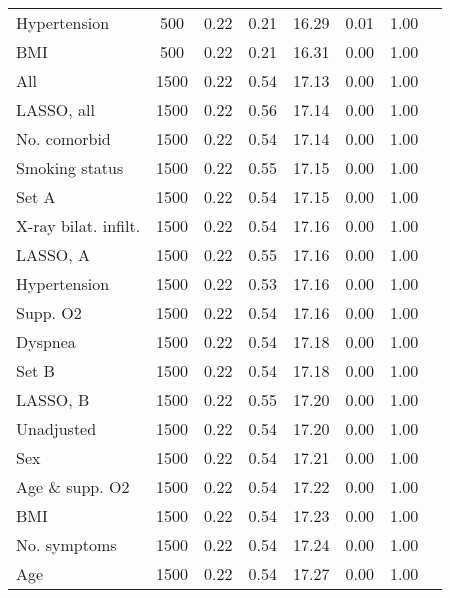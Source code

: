 \documentclass{article}
\begin{document}
{\begin{longtable}{lccccccc}
Hypertension & 500 & 0.22 & 0.21 & 16.29 & 0.01 & 1.00\\
BMI & 500 & 0.22 & 0.21 & 16.31 & 0.00 & 1.00\\ \midrule
All & 1500 & 0.22 & 0.54 & 17.13 & 0.00 & 1.00\\
LASSO, all & 1500 & 0.22 & 0.56 & 17.14 & 0.00 & 1.00\\
No. comorbid & 1500 & 0.22 & 0.54 & 17.14 & 0.00 & 1.00\\
Smoking status & 1500 & 0.22 & 0.55 & 17.15 & 0.00 & 1.00\\
Set A & 1500 & 0.22 & 0.54 & 17.15 & 0.00 & 1.00\\
X-ray bilat. infilt. & 1500 & 0.22 & 0.54 & 17.16 & 0.00 & 1.00\\
LASSO, A & 1500 & 0.22 & 0.55 & 17.16 & 0.00 & 1.00\\
Hypertension & 1500 & 0.22 & 0.53 & 17.16 & 0.00 & 1.00\\
Supp. O2 & 1500 & 0.22 & 0.54 & 17.16 & 0.00 & 1.00\\
Dyspnea & 1500 & 0.22 & 0.54 & 17.18 & 0.00 & 1.00\\
Set B & 1500 & 0.22 & 0.54 & 17.18 & 0.00 & 1.00\\
LASSO, B & 1500 & 0.22 & 0.55 & 17.20 & 0.00 & 1.00\\
Unadjusted & 1500 & 0.22 & 0.54 & 17.20 & 0.00 & 1.00\\
Sex & 1500 & 0.22 & 0.54 & 17.21 & 0.00 & 1.00\\
Age \& supp. O2 & 1500 & 0.22 & 0.54 & 17.22 & 0.00 & 1.00\\
BMI & 1500 & 0.22 & 0.54 & 17.23 & 0.00 & 1.00\\
No. symptoms & 1500 & 0.22 & 0.54 & 17.24 & 0.00 & 1.00\\
Age & 1500 & 0.22 & 0.54 & 17.27 & 0.00 & 1.00\\
\bottomrule
\hline
\end{longtable}
}

\clearpage
\end{document}
